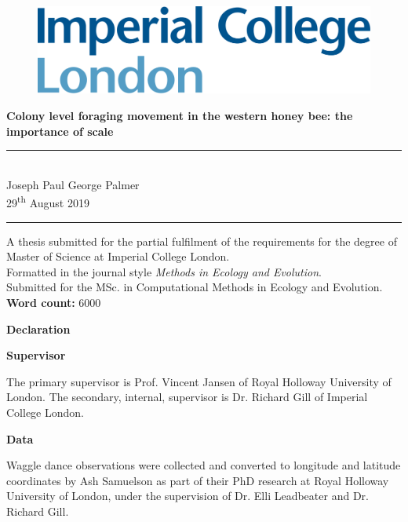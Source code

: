 \documentclass[11pt,usenames,dvipsnames,a4paper]{article}
\begin{document}
\begin{titlepage}

\begin{figure}[H]
	\includegraphics[scale=0.13]{../Poster/Images/ICL_Logo.png}
\end{figure}
\vfill
\begin{center}
\noindent
\huge{
\textbf{Colony level foraging movement in the western honey bee: the importance of scale}
}\\[1.5cm]
\noindent\rule{\textwidth}{0.05pt}\\[0.2cm]
\noindent
\Large{
	Joseph Paul George Palmer\\
	29\textsuperscript{th} August 2019
}\\

\noindent\rule{\textwidth}{0.05pt}
\vfill\vfill\vfill
\large{A thesis submitted for the partial fulfilment of the requirements for the degree of Master of Science at Imperial College London.\\[0.5cm]
	Formatted in the journal style \textit{Methods in Ecology and Evolution}.\\
	Submitted for the MSc. in Computational Methods in Ecology and Evolution.\\[1.5cm]
	\textbf{Word count:} 6000
}\\
\vfill\vfill
\end{center}

\end{titlepage}

\newpage

\begin{center}
	\Large{\textbf{Declaration}}
\end{center}
\noindent
\Large{\textbf{Supervisor}}

\noindent
The primary supervisor is Prof. Vincent Jansen of Royal Holloway University of London. The secondary, internal, supervisor is Dr. Richard Gill of Imperial College London.

\noindent
\Large{\textbf{Data}}

\noindent
Waggle dance observations were collected and converted to longitude and latitude coordinates by Ash Samuelson as part of their PhD research at Royal Holloway University of London, under the supervision of Dr. Elli Leadbeater and Dr. Richard Gill.
\end{document}
